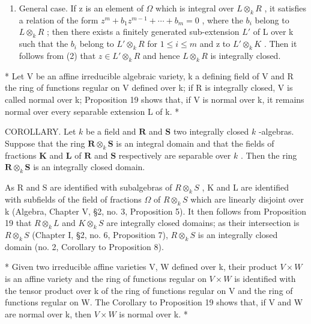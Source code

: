\begin{enumerate}
\def\labelenumi{(\arabic{enumi})}
\setcounter{enumi}{2}
\tightlist
\item
  General case. If z is an element of \(\Omega\) which is integral over \(L \otimes_{k} R\) , it satisfies a relation of the form \(z^{m} + b_{1}z^{m-1} + \cdots + b_{m} = 0\) , where the \(b_{i}\) belong to \(L \otimes_{k} R\) ; then there exists a finitely generated sub-extension \(L'\) of L over k such that the \(b_{i}\) belong to \(L' \otimes_{k} R\) for \(1 \leqslant i \leqslant m\) and z to \(L' \otimes_{k} K\) . Then it follows from (2) that \(z \in L' \otimes_{k} R\) and hence \(L \otimes_{k} R\) is integrally closed.
\end{enumerate}

* Let V be an affine irreducible algebraic variety, k a defining field of V and R the ring of functions regular on V defined over k; if R is integrally closed, V is called normal over k; Proposition 19 shows that, if V is normal over k, it remains normal over every separable extension L of k. *

COROLLARY. Let \(k\) be a field and \(\mathbf{R}\) and \(\mathbf{S}\) two integrally closed \(k\) -algebras. Suppose that the ring \(\mathbf{R} \otimes_k \mathbf{S}\) is an integral domain and that the fields of fractions \(\mathbf{K}\) and \(\mathbf{L}\) of \(\mathbf{R}\) and \(\mathbf{S}\) respectively are separable over \(k\) . Then the ring \(\mathbf{R} \otimes_k \mathbf{S}\) is an integrally closed domain.

As R and S are identified with subalgebras of \(R \otimes_{k} S\) , K and L are identified with subfields of the field of fractions \(\Omega\) of \(R \otimes_{k} S\) which are linearly disjoint over k (Algebra, Chapter V, §2, no. 3, Proposition 5). It then follows from Proposition 19 that \(R \otimes_{k} L\) and \(K \otimes_{k} S\) are integrally closed domains; as their intersection is \(R \otimes_{k} S\) (Chapter I, §2, no. 6, Proposition 7), \(R \otimes_{k} S\) is an integrally closed domain (no. 2, Corollary to Proposition 8).

* Given two irreducible affine varieties V, W defined over k, their product \(V \times W\) is an affine variety and the ring of functions regular on \(V \times W\) is identified with the tensor product over k of the ring of functions regular on V and the ring of functions regular on W. The Corollary to Proposition 19 shows that, if V and W are normal over k, then \(V \times W\) is normal over k. *

